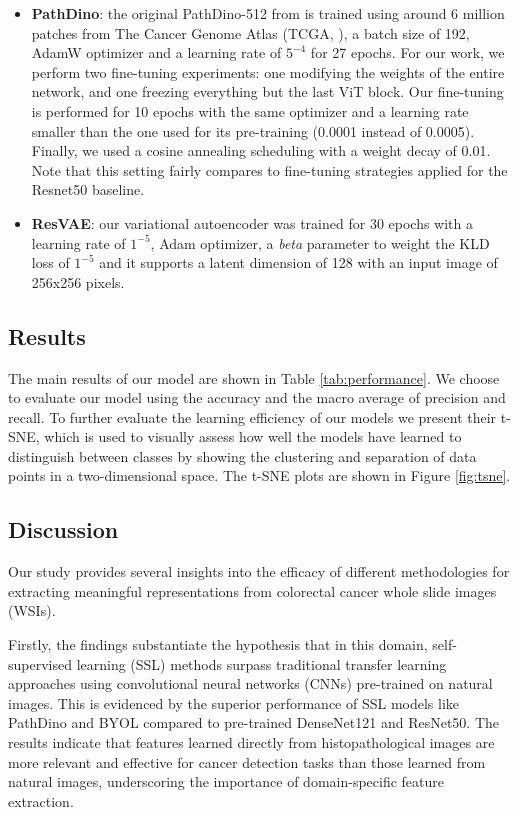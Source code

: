 \documentclass[peerreview]{IEEEtran}
\begin{document}
\begin{itemize}
\item \textbf{PathDino}: the original PathDino-512 from \cite{pathdino} is trained using around 6 million patches from The Cancer Genome Atlas (TCGA, \cite{weinstein2013cancer}), a batch size of 192, AdamW optimizer and a learning rate of $5^{-4}$ for 27 epochs. For our work, we perform two fine-tuning experiments: one modifying the weights of the entire network, and one freezing everything but the last ViT block. Our fine-tuning is performed for 10 epochs with the same optimizer and a learning rate smaller than the one used for its pre-training (0.0001 instead of 0.0005). Finally, we used a cosine annealing scheduling with a weight decay of 0.01. Note that this setting fairly compares to fine-tuning strategies applied for the Resnet50 baseline.
    

\item \textbf{ResVAE}: our variational autoencoder was trained for 30 epochs with a learning rate of $1^{-5}$, Adam optimizer, a \textit{beta} parameter to weight the KLD loss of $1^{-5}$ and it supports a latent dimension of 128 with an input image of 256x256 pixels.
\end{itemize}


\subsection{Results}

The main results of our model are shown in Table
\ref{tab:performance}. We choose to evaluate our model using the accuracy and the macro average of precision and recall. To further evaluate the learning efficiency of our models we present their t-SNE, which is used to visually assess how well the models have learned to distinguish between classes by showing the clustering and separation of data points in a two-dimensional space. The t-SNE plots are shown in Figure \ref{fig:tsne}.


\subsection{Discussion}
Our study provides several insights into the efficacy of different methodologies for extracting meaningful representations from colorectal cancer whole slide images (WSIs).

Firstly, the findings substantiate the hypothesis that in this domain, self-supervised learning (SSL) methods surpass traditional transfer learning approaches using convolutional neural networks (CNNs) pre-trained on natural images. This is evidenced by the superior performance of SSL models like PathDino and BYOL compared to pre-trained DenseNet121 and ResNet50. The results indicate that features learned directly from histopathological images are more relevant and effective for cancer detection tasks than those learned from natural images, underscoring the importance of domain-specific feature extraction.
\end{document}
